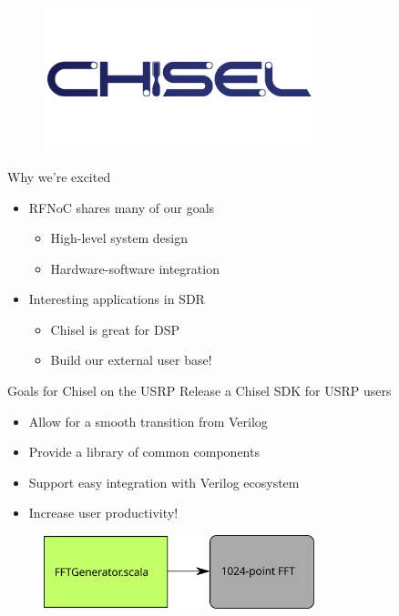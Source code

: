 \documentclass{beamer}
\author{Albert Magyar}
\date{\today}
\newcommand{\gwidth}[0]{0.7\textwidth}
\begin{document}
\begin{frame}
  \titlepage
  \begin{figure}
    \centering
    \includegraphics[width=\gwidth]{figs/chisel.svg}
  \end{figure}
\end{frame}

\begin{frame}{Why we're excited}
  \begin{itemize}
  \item RFNoC shares many of our goals
    \begin{itemize}
    \item High-level system design
    \item Hardware-software integration
    \end{itemize}
  \item Interesting applications in SDR
    \begin{itemize}
    \item Chisel is great for DSP
    \color{blue}\item<2-> Build our external user base!\color{black}
    \end{itemize}
  \end{itemize}
\end{frame}

\begin{frame}{Goals for Chisel on the USRP}
  Release a Chisel SDK for USRP users
  \begin{itemize}
  \item Allow for a smooth transition from Verilog
  \item Provide a library of common components
  \item Support easy integration with Verilog ecosystem
  \item Increase user productivity!
  \end{itemize}
  \begin{figure}
    \centering
    \includegraphics[width=\gwidth]{figs/fftgen.svg}
  \end{figure}
\end{frame}
\end{document}
